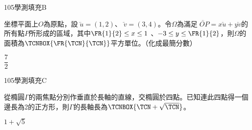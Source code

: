     \begin{QUESTION}
        \begin{ExamInfo}{105}{學測}{填充}{B}
        \end{ExamInfo}
        \begin{ExamAnsRateInfo}{22}{54}{11}{1}
        \end{ExamAnsRateInfo}
        \begin{QBODY}
            坐標平面上$O$為原點，設$\lvec{u}$$=(1,2)$、$\lvec{v}=(3,4)$。令$\Omega $為滿足$\lvec{OP}=x\lvec{u}+y\lvec{v}$的所有點$P$所形成的區域，其中$\FR{1}{2}\le x\le 1\ $、$-3\le y\le \FR{1}{2}$，則$\Omega $的面積為$\TCNBOX{\FR{\TCN}{\TCN}}$平方單位。（化成最簡分數）
        \end{QBODY}
        \begin{QFROMS}
        \end{QFROMS}
        \begin{QTAGS}\end{QTAGS}
        \begin{QANS}
            $\dfrac{7}{2}$
        \end{QANS}
        \begin{QSOLLIST}
        \end{QSOLLIST}
        \begin{QEMPTYSPACE}
        \end{QEMPTYSPACE}
    \end{QUESTION}
    \begin{QUESTION}
        \begin{ExamInfo}{105}{學測}{填充}{C}
        \end{ExamInfo}
        \begin{ExamAnsRateInfo}{43}{85}{40}{4}
        \end{ExamAnsRateInfo}
        \begin{QBODY}
            從橢圓$\Gamma $的兩焦點分別作垂直於長軸的直線，交橢圓於四點。已知連此四點得一個邊長為2的正方形，則$\Gamma $的長軸長為$\TCNBOX{\TCN +\sqrt{\TCN}}$。
        \end{QBODY}
        \begin{QFROMS}
        \end{QFROMS}
        \begin{QTAGS}\end{QTAGS}
        \begin{QANS}
            $1+\sqrt{5}$
        \end{QANS}
        \begin{QSOLLIST}
        \end{QSOLLIST}
        \begin{QEMPTYSPACE}
        \end{QEMPTYSPACE}
    \end{QUESTION}
